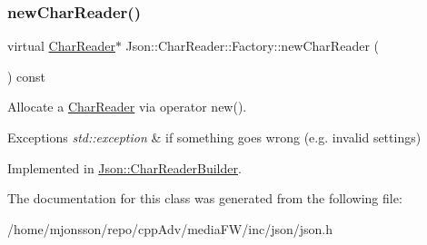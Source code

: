 \subsubsection{\texorpdfstring{new\+Char\+Reader()}{newCharReader()}}
{\footnotesize\ttfamily virtual \hyperlink{classJson_1_1CharReader}{Char\+Reader}$\ast$ Json\+::\+Char\+Reader\+::\+Factory\+::new\+Char\+Reader (\begin{DoxyParamCaption}{ }\end{DoxyParamCaption}) const\hspace{0.3cm}{\ttfamily [pure virtual]}}



Allocate a \hyperlink{classJson_1_1CharReader}{Char\+Reader} via operator new(). 


\begin{DoxyExceptions}{Exceptions}
{\em std\+::exception} & if something goes wrong (e.\+g. invalid settings) \\
\hline
\end{DoxyExceptions}


Implemented in \hyperlink{classJson_1_1CharReaderBuilder_a3a262fcc76c1eb8eebfd4718fb4e9722}{Json\+::\+Char\+Reader\+Builder}.



The documentation for this class was generated from the following file\+:\begin{DoxyCompactItemize}
\item 
/home/mjonsson/repo/cpp\+Adv/media\+F\+W/inc/json/json.\+h\end{DoxyCompactItemize}
